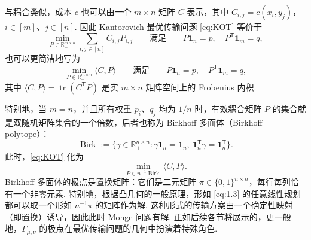 与耦合类似，成本 $c$ 也可以由一个 $m\times n$ 矩阵 $C$ 表示，其中 $C_{i,j}=c(x_i,y_j)$，$i\in[m]$、$j\in[n]$. 因此 Kantorovich 最优传输问题 \eqref{eq:KOT} 等价于
$$
\min_{P\in\mathbb R_+^{m\times n}}\sum_{i,j\in[n]}C_{i,j}P_{i,j}
\qquad\text{满足}\qquad
P\mathbf1_n=p,\quad P^{\mathsf T}\mathbf1_m=q,
$$
也可以更简洁地写为
$$
\min_{P\in\mathbb R_+^{m\times n}}\langle C,P\rangle
\qquad\text{满足}\qquad
P\mathbf1_n=p,\quad P^{\mathsf T}\mathbf1_m=q,
$$
其中 $\langle C,P\rangle=\operatorname{tr}(C^{\mathsf T}P)$ 是实 $m\times n$ 矩阵空间上的 Frobenius 内积.

特别地，当 $m=n$，并且所有权重 $p_i$、$q_j$ 均为 $1/n$ 时，有效耦合矩阵 $P$ 的集合就是双随机矩阵集合的一个倍数，后者也称为 Birkhoff 多面体（Birkhoff polytope）：
\begin{equation}\label{eq:1.2}
\operatorname{Birk}:=\{\gamma\in\mathbb R_+^{n\times n}:\gamma\mathbf1_n=\mathbf1_n,\ \mathbf1_n^{\mathsf T}\gamma=\mathbf1_n^{\mathsf T}\}.
\end{equation}
此时，\eqref{eq:KOT} 化为
\begin{equation}\label{eq:1.3}
\min_{P\in n^{-1}\operatorname{Birk}}\langle C,P\rangle.
\end{equation}
Birkhoff 多面体的极点是置换矩阵：它们是二元矩阵 $\pi\in\{0,1\}^{n\times n}$，每行每列恰有一个非零元素. 特别地，根据凸几何的一般原理，形如 \eqref{eq:1.3} 的任意线性规划都可以取一个形如 $n^{-1}\pi$ 的矩阵作为解. 这种形式的传输方案由一个确定性映射（即置换）诱导，因此此时 Monge 问题有解. 正如后续各节将展示的，更一般地，$\Gamma_{\mu,\nu}$ 的极点在最优传输问题的几何中扮演着特殊角色.
